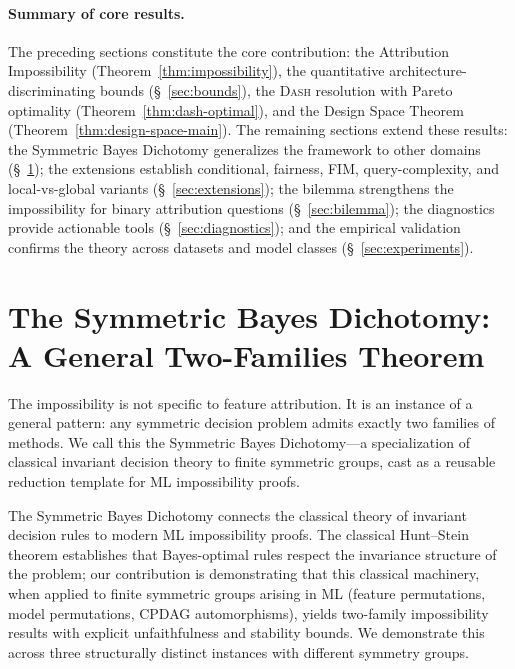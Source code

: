 \documentclass{jmlr}
\newcommand{\DASH}{\textsc{Dash}}
\begin{document}
\paragraph{Summary of core results.}
The preceding sections constitute the core contribution: the Attribution Impossibility (Theorem~\ref{thm:impossibility}), the quantitative architecture-discriminating bounds (\S~\ref{sec:bounds}), the \DASH{} resolution with Pareto optimality (Theorem~\ref{thm:dash-optimal}), and the Design Space Theorem (Theorem~\ref{thm:design-space-main}). The remaining sections extend these results: the Symmetric Bayes Dichotomy generalizes the framework to other domains (\S~\ref{sec:sbd}); the extensions establish conditional, fairness, FIM, query-complexity, and local-vs-global variants (\S~\ref{sec:extensions}); the bilemma strengthens the impossibility for binary attribution questions (\S~\ref{sec:bilemma}); the diagnostics provide actionable tools (\S~\ref{sec:diagnostics}); and the empirical validation confirms the theory across datasets and model classes (\S~\ref{sec:experiments}).


\section{The Symmetric Bayes Dichotomy: A General Two-Families Theorem}
\label{sec:sbd}

The impossibility is not specific to feature attribution. It is an instance of a general pattern: any symmetric decision problem admits exactly two families of methods. We call this the Symmetric Bayes Dichotomy---a specialization of classical invariant decision theory \citep{lehmann2005testing} to finite symmetric groups, cast as a reusable reduction template for ML impossibility proofs.

The Symmetric Bayes Dichotomy connects the classical theory of invariant decision rules \citep{lehmann2005testing,hunt1946} to modern ML impossibility proofs. The classical Hunt--Stein theorem establishes that Bayes-optimal rules respect the invariance structure of the problem; our contribution is demonstrating that this classical machinery, when applied to finite symmetric groups arising in ML (feature permutations, model permutations, CPDAG automorphisms), yields two-family impossibility results with explicit unfaithfulness and stability bounds. We demonstrate this across three structurally distinct instances with different symmetry groups.
\end{document}
